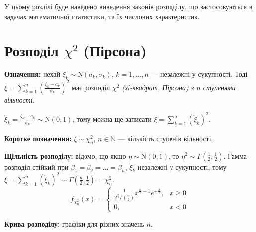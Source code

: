 
У цьому розділі буде наведено виведення законів розподілу, що застосовуються
в задачах математичної статистики, та їх числових характеристик.

\section{Розподіл \texorpdfstring{$\chi^2$}{x2} (Пірсона)}
\noindent\textbf{Означення:}
    нехай $\xi_k \sim \mathrm{N}(a_k, \sigma_k)$, $k= 1,..., n$ --- незалежні у сукупності.
    Тоді $\xi = \sum\limits_{k=1}^n \left( \frac{\xi_k - a_k}{\sigma_k}\right)^2$ має
    розподіл \emph{$\chi^2$ (хі-квадрат, Пірсона) з $n$ ступенями вільності}.

    \noindent$\mathring{\xi}_{k} = \frac{\xi_k - a_k}{\sigma_k} \sim \mathrm{N}(0, 1)$, тому можна ще записати
    $\xi = \sum\limits_{k=1}^n (\mathring{\xi}_{k})^2$.

\noindent\textbf{Коротке позначення:} $\xi \sim \chi_n^2$, $n\in\mathbb{N}$ --- кількість ступенів вільності.

\noindent\textbf{Щільність розподілу:}
відомо, що якщо $\eta \sim \mathrm{N}(0, 1)$, то $\eta^2 \sim \Gamma\left(\frac{1}{2}, \frac{1}{2}\right)$.
Гамма-розподіл стійкий при $\beta_1 = \beta_2 = ... = \beta_n$, $\mathring{\xi}_{k}$ незалежні у сукупності,
тому $\xi = \sum\limits_{k=1}^n (\mathring{\xi}_{k})^2 \sim \Gamma\left(\frac{n}{2}, \frac{1}{2}\right) = \chi_n^2$.
\begin{equation*}
    f_{\chi_n^2}(x) = \begin{cases}
        \frac{1}{2^{\frac{n}{2}} \Gamma\left(\frac{n}{2}\right)} x^{\frac{n}{2}-1} e^{-\frac{x}{2}}, & x \geq 0 \\
        0, & x < 0
    \end{cases}
\end{equation*}

\noindent \textbf{Крива розподілу:} графіки для різних значень $n$.


